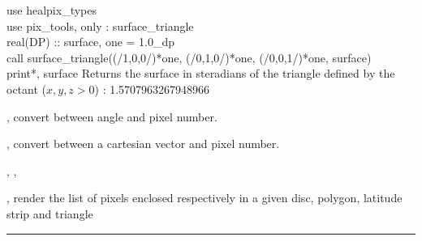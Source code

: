 \begin{example}
{
use healpix\_types \\
use pix\_tools,    only : surface\_triangle \\
real(DP) :: surface, one = 1.0\_dp \\
call surface\_triangle((/1,0,0/)*one, (/0,1,0/)*one, (/0,0,1/)*one, surface)  \\
print*, surface
}
{
Returns the surface in steradians of the triangle defined by the octant ($x,y,z>0$) : 1.5707963267948966
}
\end{example}

\begin{related}
  \begin{sulist}{} %
  \item[\htmlref{pix2ang}{sub:pix_tools}, \htmlref{ang2pix}{sub:pix_tools}] convert between angle and pixel number.
  \item[\htmlref{pix2vec}{sub:pix_tools}, \htmlref{vec2pix}{sub:pix_tools}] convert between a cartesian vector and pixel number.
  \item[\htmlref{query\_disc}{sub:query_disc}, \htmlref{query\_polygon}{sub:query_polygon},]
  \item[\htmlref{query\_strip}{sub:query_strip}, \htmlref{query\_triangle}{sub:query_triangle}] render the list of pixels enclosed
  respectively in a given disc, polygon, latitude strip and triangle

  \end{sulist}
\end{related}

\rule{\hsize}{2mm}

\newpage
